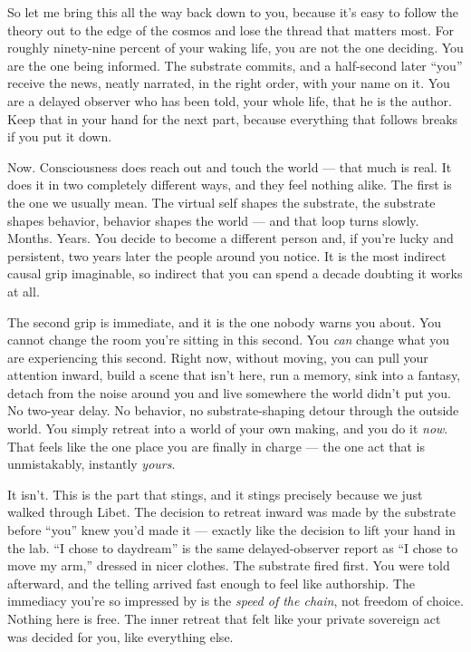 \documentclass[11pt, twoside, openright]{book}
\begin{document}
So let me bring this all the way back down to you, because it's easy to follow the theory out to the edge of the cosmos and lose the thread that matters most. For roughly ninety-nine percent of your waking life, you are not the one deciding. You are the one being informed. The substrate commits, and a half-second later ``you'' receive the news, neatly narrated, in the right order, with your name on it. You are a delayed observer who has been told, your whole life, that he is the author. Keep that in your hand for the next part, because everything that follows breaks if you put it down.

Now. Consciousness does reach out and touch the world --- that much is real. It does it in two completely different ways, and they feel nothing alike. The first is the one we usually mean. The virtual self shapes the substrate, the substrate shapes behavior, behavior shapes the world --- and that loop turns slowly. Months. Years. You decide to become a different person and, if you're lucky and persistent, two years later the people around you notice. It is the most indirect causal grip imaginable, so indirect that you can spend a decade doubting it works at all.

The second grip is immediate, and it is the one nobody warns you about. You cannot change the room you're sitting in this second. You \textit{can} change what you are experiencing this second. Right now, without moving, you can pull your attention inward, build a scene that isn't here, run a memory, sink into a fantasy, detach from the noise around you and live somewhere the world didn't put you. No two-year delay. No behavior, no substrate-shaping detour through the outside world. You simply retreat into a world of your own making, and you do it \textit{now}. That feels like the one place you are finally in charge --- the one act that is unmistakably, instantly \textit{yours}.

It isn't. This is the part that stings, and it stings precisely because we just walked through Libet. The decision to retreat inward was made by the substrate before ``you'' knew you'd made it --- exactly like the decision to lift your hand in the lab. ``I chose to daydream'' is the same delayed-observer report as ``I chose to move my arm,'' dressed in nicer clothes. The substrate fired first. You were told afterward, and the telling arrived fast enough to feel like authorship. The immediacy you're so impressed by is the \textit{speed of the chain}, not freedom of choice. Nothing here is free. The inner retreat that felt like your private sovereign act was decided for you, like everything else.
\end{document}
